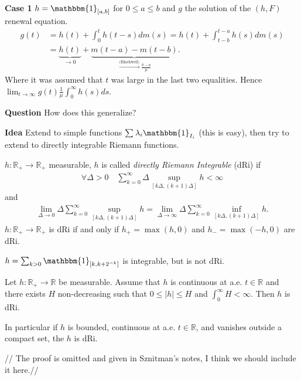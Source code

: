 \noindent
\textbf{Case 1} $h=\mathbbm{1}_{[a,b]} $ for $0\leq a \leq b$ and $g$ the solution of the $(h,F)$ renewal equation. 
\begin{align}
	g(t) &= h(t) + \int_{0}^{t} h(t-s)dm(s) = h(t) + \int_{t-b}^{t-a} h(s)dm(s) \\
	     &= \underbrace{h(t)}_{\to 0} + \underbrace{m(t-a) - m(t-b)}_{\stackrel{\textrm{(Blackwell)}}{\to} \frac{b-a}{\mu }}.
\end{align}
Where it was assumed that $t$ was large in the last two equalities. Hence $\lim_{t\to \infty } g(t) \frac{1}{\mu } \int_{0}^{\infty} h(s) ds$. 

\noindent \textbf{Question} How does this generalize?

{\color{blue}\noindent
\textbf{Idea} Extend to simple functions $\sum_{}^{} \lambda_i \mathbbm{1}_{I_i}$ (this is easy), then try to extend to directly integrable Riemann functions.}

\begin{defn}
	$h: \mathbb{R}_+ \to \mathbb{R}_+$ measurable, $h$ is called \emph{directly Riemann Integrable} (dRi) if 
\begin{align}
	\forall \Delta >0 \quad \sum_{k=0}^{\infty}\Delta \sup_{[k \Delta, (k+1)\Delta]} h < \infty
\end{align}
	and
	\begin{align}
		\lim_{\Delta \to 0} \Delta \sum_{k=0}^{\infty} \sup_{[k \Delta,(k+1)\Delta] } h = \lim _{\Delta \to \infty} \Delta \sum_{k=0}^{\infty} \inf_{[k \Delta, (k+1)\Delta]}h.
	\end{align}
	$h: \mathbb{R}_+ \to \mathbb{R}_+$ is dRi if and only if $h_+=\max(h,0)$ and $h_-=\max(-h,0)$ are dRi.
\end{defn}
\begin{rmk}
	$h=\sum_{k> 0 }^{} \mathbbm{1}_{[k,k+2^{-k}]} $ is integrable, but is not dRi.	
\begin{figure}
	\centering
{}
\end{figure}
\end{rmk}


\begin{prop}[]
	Let $h: \mathbb{R}_+ \to \mathbb{R}$ be measurable. Assume that $h$ is continuous at a.e. $t \in \mathbb{R}$ and there exists $H$ non-decreasing such that $0 \leq |h| \leq H$ and $\int_{0}^{\infty} H < \infty$. Then $h$ is dRi. 
\end{prop}
\begin{rmk}[]
	In particular if $h$ is bounded, continuous at a.e. $t \in \mathbb{R}$, and vanishes outside a compact set, the $h$ is dRi.
\end{rmk}
{\color{blue}// The proof is omitted and given in Sznitman's notes, I think we should include it here.//}

